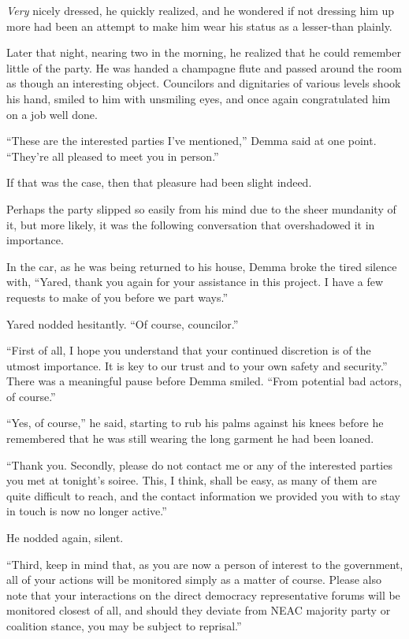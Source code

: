 \emph{Very} nicely dressed, he quickly realized, and he wondered if not dressing him up more had been an attempt to make him wear his status as a lesser-than plainly.

Later that night, nearing two in the morning, he realized that he could remember little of the party. He was handed a champagne flute and passed around the room as though an interesting object. Councilors and dignitaries of various levels shook his hand, smiled to him with unsmiling eyes, and once again congratulated him on a job well done.

``These are the interested parties I've mentioned,'' Demma said at one point. ``They're all pleased to meet you in person.''

If that was the case, then that pleasure had been slight indeed.

Perhaps the party slipped so easily from his mind due to the sheer mundanity of it, but more likely, it was the following conversation that overshadowed it in importance.

In the car, as he was being returned to his house, Demma broke the tired silence with, ``Yared, thank you again for your assistance in this project. I have a few requests to make of you before we part ways.''

Yared nodded hesitantly. ``Of course, councilor.''

``First of all, I hope you understand that your continued discretion is of the utmost importance. It is key to our trust and to your own safety and security.'' There was a meaningful pause before Demma smiled. ``From potential bad actors, of course.''

``Yes, of course,'' he said, starting to rub his palms against his knees before he remembered that he was still wearing the long garment he had been loaned.

``Thank you. Secondly, please do not contact me or any of the interested parties you met at tonight's soiree. This, I think, shall be easy, as many of them are quite difficult to reach, and the contact information we provided you with to stay in touch is now no longer active.''

He nodded again, silent.

``Third, keep in mind that, as you are now a person of interest to the government, all of your actions will be monitored simply as a matter of course. Please also note that your interactions on the direct democracy representative forums will be monitored closest of all, and should they deviate from NEAC majority party or coalition stance, you may be subject to reprisal.''

